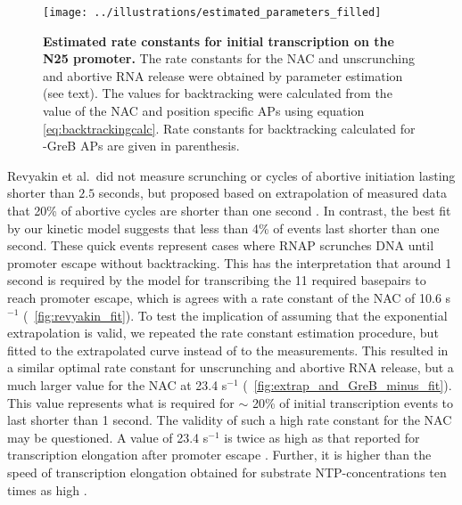 \begin{figure}[h]
    \begin{center}
      \texttt{[image: ../illustrations/estimated\_parameters\_filled]}
    \end{center}
    \caption{ {\bf Estimated rate constants for initial transcription on the N25
      promoter.} The rate constants for the NAC and unscrunching and abortive
      RNA release were obtained by parameter estimation (see text). The values
      for backtracking were calculated from the value of the NAC and position
      specific APs using equation \eqref{eq:backtrackingcalc}. Rate constants
      for backtracking calculated for -GreB APs are given in parenthesis.}
    \label{fig:estimated_parameters}
\end{figure}

Revyakin et al.\ did not measure scrunching or cycles of abortive initiation
lasting shorter than $2.5$ seconds, but proposed based on extrapolation of
measured data that 20\% of abortive cycles are shorter than one second
\cite{revyakin_abortive_2006}. In contrast, the best fit by our kinetic model
suggests that less than 4\% of events last shorter than one second. These
quick events represent cases where RNAP scrunches DNA until promoter escape
without backtracking. This has the interpretation that around 1 second is
required by the model for transcribing the 11 required basepairs to reach
promoter escape, which is agrees with a rate constant of the NAC of 10.6
s$^{-1}$ (\FIG~\ref{fig:revyakin_fit}). To test the implication of assuming
that the exponential extrapolation is valid, we repeated the rate constant
estimation procedure, but fitted to the extrapolated curve instead of to the
measurements. This resulted in a similar optimal rate constant for
unscrunching and abortive RNA release, but a much larger value for the NAC at
23.4 s$^{-1}$ (\FIG~\ref{fig:extrap_and_GreB_minus_fit}). This value
represents what is required for $\sim$ 20\% of initial transcription events to
last shorter than 1 second. The validity of such a high rate constant for the
NAC may be questioned. A value of 23.4 s$^{-1}$ is twice as high as that
reported for transcription elongation after promoter escape
\cite{revyakin_abortive_2006}. Further, it is higher than the speed of
transcription elongation obtained for substrate NTP-concentrations ten times
as high \cite{bai_mechanochemical_2007}.

